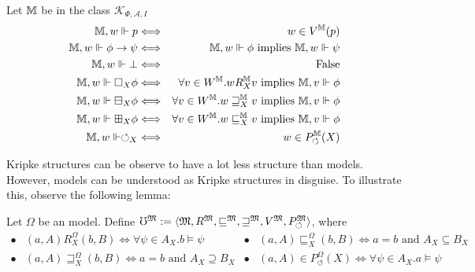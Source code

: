 \begin{definition}
  Let $\mathbbm{M}$ be in the class $\mathcal{K}_{\Phi, \mathcal{A}, I}$
  \begin{eqnarray*}
    \mathbbm{M}, w \Vdash p & \Longleftrightarrow & w \in V^{\mathbbm{M}}
    (p)\\
    \mathbbm{M}, w \Vdash \phi \rightarrow \psi & \Longleftrightarrow &
    \mathbbm{M}, w \Vdash \phi \text{ implies } \mathbbm{M}, w \Vdash \psi\\
    \mathbbm{M}, w \Vdash \bot & \Longleftrightarrow & \text{False}\\
    \mathbbm{M}, w \Vdash \Box_X \phi & \Longleftrightarrow & \forall v \in
    W^{\mathbbm{M}} . w R^{\mathbbm{M}}_X v \text{ implies } \mathbbm{M}, v
    \Vdash \phi\\
    \mathbbm{M}, w \Vdash \boxminus_X \phi & \Longleftrightarrow & \forall v
    \in W^{\mathbbm{M}} . w \sqsupseteq^{\mathbbm{M}}_X v \text{ implies }
    \mathbbm{M}, v \Vdash \phi\\
    \mathbbm{M}, w \Vdash \boxplus_X \phi & \Longleftrightarrow & \forall v
    \in W^{\mathbbm{M}} . w \sqsubseteq^{\mathbbm{M}}_X v \text{ implies }
    \mathbbm{M}, v \Vdash \phi\\
    \mathbbm{M}, w \Vdash \circlearrowleft_X & \Longleftrightarrow & w \in
    P_{\circlearrowleft}^{\mathbbm{M}} (X)
  \end{eqnarray*}
\end{definition}
Kripke structures can be observe to have a lot less structure than
 models.  However,  models can be understood as
Kripke structures in disguise.  To illustrate this, observe the following
lemma:
\begin{definition}
Let $\Omega$ be an  model.  Define
  $\mho^{\Omega} \assign \langle \Omega, R^{\Omega},
  \sqsubseteq^{\Omega}, \sqsupseteq^{\Omega}, V^{\Omega},
  P_{\circlearrowleft}^{\Omega} \rangle$, where
  \[ \begin{array}{llll}
       \bullet & \text{$(a, A) R^{\Omega}_X (b, B) \Longleftrightarrow \forall
       \psi \in A_X .b \models \psi$} & \bullet & (a, A)
       \sqsubseteq^{\Omega}_X (b, B) \Longleftrightarrow a = b \text{ and }
       A_X \subseteq B_X\\
       \bullet & (a, A) \sqsupseteq^{\Omega}_X (b, B) \Longleftrightarrow a =
       b \text{ and } A_X \supseteq B_X & \bullet & (a, A) \in
       P_{\circlearrowleft}^{\Omega} (X) \Longleftrightarrow \forall \psi \in
       A_X .a \models \psi
     \end{array} \]
\end{definition}
